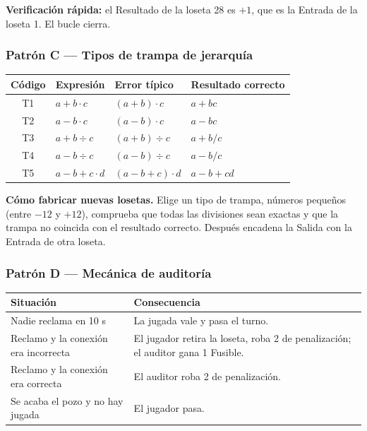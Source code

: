 \documentclass[12pt, letterpaper]{article}
\begin{document}
\textbf{Verificación rápida:} el Resultado de la loseta 28 es $+1$, que es la Entrada de la loseta 1. El bucle cierra.

\subsubsection{Patrón C — Tipos de trampa de jerarquía}

\begin{center}
\small
\begin{tabular}{@{}c l l l@{}}
\toprule
\textbf{Código} & \textbf{Expresión} & \textbf{Error típico} & \textbf{Resultado correcto}\\
\midrule
T1 & $a+b\cdot c$ & $(a+b)\cdot c$ & $a+bc$\\
T2 & $a-b\cdot c$ & $(a-b)\cdot c$ & $a-bc$\\
T3 & $a+b\div c$ & $(a+b)\div c$ & $a+b/c$\\
T4 & $a-b\div c$ & $(a-b)\div c$ & $a-b/c$\\
T5 & $a-b+c\cdot d$ & $(a-b+c)\cdot d$ & $a-b+cd$\\
\bottomrule
\end{tabular}
\end{center}

\begin{cuadroadvertencia}
\textbf{Cómo fabricar nuevas losetas.} Elige un tipo de trampa, números pequeños (entre $-12$ y $+12$), comprueba que todas las divisiones sean exactas y que la trampa no coincida con el resultado correcto. Después encadena la Salida con la Entrada de otra loseta.
\end{cuadroadvertencia}

\subsubsection{Patrón D — Mecánica de auditoría}

\begin{center}
\small
\begin{tabular}{@{}l p{9.6cm}@{}}
\toprule
\textbf{Situación} & \textbf{Consecuencia}\\
\midrule
Nadie reclama en 10 s & La jugada vale y pasa el turno.\\
Reclamo y la conexión era incorrecta & El jugador retira la loseta, roba 2 de penalización; el auditor gana 1 Fusible.\\
Reclamo y la conexión era correcta & El auditor roba 2 de penalización.\\
Se acaba el pozo y no hay jugada & El jugador pasa.\\
\bottomrule
\end{tabular}
\end{center}
\end{document}
